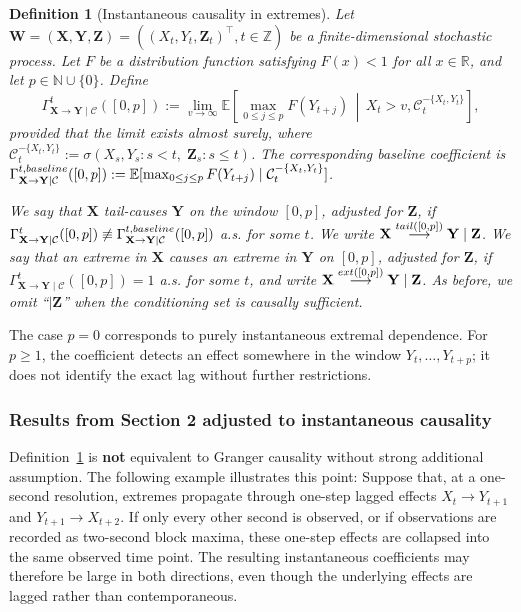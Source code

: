 \documentclass[a4paper,11pt]{article}
\newtheorem{definition}{Definition}
\newcommand{\baseline}{{\rm baseline}}
\begin{document}
\begin{definition}[Instantaneous causality in extremes]
\label{definition_instantaneous_causality}
Let \(\mathbf W=(\mathbf X,\mathbf Y,\mathbf Z)=((X_t,Y_t,\mathbf Z_t)^\top,t\in\mathbb Z)\) be a finite-dimensional stochastic process. Let \(F\) be a distribution function satisfying \(F(x)<1\) for all \(x\in\mathbb R\), and let \(p\in\mathbb N\cup\{0\}\). Define
\[
\Gamma^{t}_{\mathbf X\to \mathbf Y\mid\mathcal C}([0,p])
:=
\lim_{v\to\infty}
\mathbb E\!\left[
\max_{0\le j\le p} F(Y_{t+j})
\,\middle|\,
X_t>v,\mathcal C_t^{-\{X_t,Y_t\}}
\right],
\]
provided that the limit exists almost surely, where
\(\mathcal C_t^{-\{X_t,Y_t\}}:=\sigma(X_s,Y_s:s<t,\;\mathbf Z_s:s\le t)\). The corresponding baseline coefficient is
\(\Gamma^{t,\baseline}_{\mathbf X\to \mathbf Y\mid\mathcal C}([0,p])
:=\mathbb E[\max_{0\le j\le p}F(Y_{t+j})\mid \mathcal C_t^{-\{X_t,Y_t\}}]\).

We say that \(\mathbf X\) tail-causes \(\mathbf Y\) on the window \([0,p]\), adjusted for \(\mathbf Z\), if
\(\Gamma^{t}_{\mathbf X\to \mathbf Y\mid\mathcal C}([0,p])
\not\equiv
\Gamma^{t,\baseline}_{\mathbf X\to \mathbf Y\mid\mathcal C}([0,p])\) a.s. for some \(t\). We write
\(\mathbf X\overset{{\rm tail}([0,p])}{\longrightarrow}\mathbf Y\mid\mathbf Z\).
We say that an extreme in \(\mathbf X\) causes an extreme in \(\mathbf Y\) on \([0,p]\), adjusted for \(\mathbf Z\), if
\(\Gamma^{t}_{\mathbf X\to \mathbf Y\mid\mathcal C}([0,p])=1\) a.s. for some \(t\), and write
\(\mathbf X\overset{{\rm ext}([0,p])}{\longrightarrow}\mathbf Y\mid\mathbf Z\).
As before, we omit ``\(\mid\mathbf Z\)'' when the conditioning set is causally sufficient.
\end{definition}

The case \(p=0\) corresponds to purely instantaneous extremal dependence. For \(p\ge1\), the coefficient detects an effect somewhere in the window \(Y_t,\ldots,Y_{t+p}\); it does not identify the exact lag without further restrictions.


\subsubsection{Results from Section 2 adjusted to instantaneous causality}

Definition~\ref{definition_instantaneous_causality} is \textbf{not} equivalent to Granger causality without strong additional assumption. The following example illustrates this point: Suppose that, at a one-second resolution, extremes propagate through one-step lagged effects \(X_t\to Y_{t+1}\) and \(Y_{t+1}\to X_{t+2}\). If only every other second is observed, or if observations are recorded as two-second block maxima, these one-step effects are collapsed into the same observed time point. The resulting instantaneous coefficients may therefore be large in both directions, even though the underlying effects are lagged rather than contemporaneous.    
\end{document}
